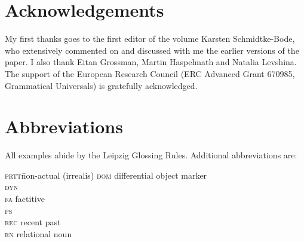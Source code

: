 \documentclass[output=paper]{langsci/langscibook}
\begin{document}
\newpage

\section*{Acknowledgements} 

My first thanks goes to the first editor of the volume Karsten Schmidtke-Bode, who extensively commented on and discussed with me the earlier versions of the paper. I also thank Eitan Grossman, Martin Haspelmath and Natalia Levshina. The support of the European Research Council (ERC Advanced Grant 670985, Grammatical Universals) is gratefully acknowledged.

\section*{Abbreviations} 

All examples abide by the Leipzig Glossing Rules. Additional abbreviations are: 

\begin{multicols}{2}
\begin{tabbing}
\textsc{prtt}\hspace{5mm}\=non-actual (irrealis) \hspace{5mm}\kill
\textsc{dom}  \>  differential object marker                 \\
\textsc{dyn} \>                           \\
\textsc{fa}   \>  factitive                  \\
\textsc{ps} \>   \\
\textsc{rec} \>  recent past \\
\textsc{rn} \>  relational noun \\
\end{tabbing}
\end{multicols}

\sloppy
\printbibliography[heading=subbibliography,notkeyword=this] 
\end{document}
